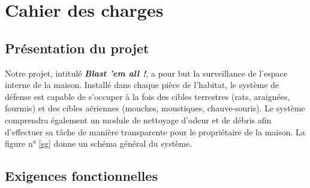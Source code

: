 
\section{Cahier des charges}

\subsection{Présentation du projet}

Notre projet, intitulé \textit{\textbf{Blast 'em all !}}, a pour but la
surveillance de l'espace interne de la maison. Installé dans chaque pièce
de l'habitat, le système de défense est capable de s'occuper à la fois des
cibles terrestres (rats, araignées, fourmis) et des cibles aériennes
(mouches, moustiques, chauve-souris). Le système comprendra également un
module de nettoyage d'odeur et de débris afin d'effectuer sa tâche de
manière transparente pour le propriétaire de la maison. La figure n° \ref{sg}
donne un schéma général du système.


\subsection{Exigences fonctionnelles}


